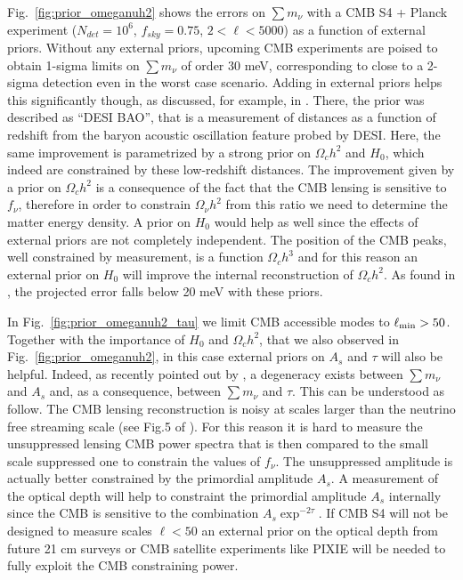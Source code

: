 \documentclass[aps,prd,reprint,superscriptaddress]{revtex4-1}
\newcommand{\reffig}[1]{Fig.~\ref{fig:#1}}
\begin{document}
\reffig{prior_omeganuh2} shows the errors on $\sum m_\nu$ with a CMB S4 + Planck experiment ($N_{det}=10^{6}$, $f_{sky}=0.75$,  $2<\ell<5000$) as a function of external priors.
Without any external priors, upcoming CMB experiments are poised to obtain 1-sigma limits on $\sum m_\nu$ of order 30 meV, corresponding to close to a 2-sigma detection even in the worst case scenario. Adding in external priors helps this significantly though, as discussed, for example, in \cite{2013arXiv1309.5383A,pan:2015,allison:2015}. 
There, the prior was described as ``DESI BAO'', that is a measurement of distances as a function of redshift from the baryon acoustic oscillation feature probed by DESI. Here, the same improvement is parametrized by a strong prior on $\Omega_ch^2$ and $H_{0}$, which indeed are constrained by these low-redshift distances.
The improvement given by a prior on $\Omega_ch^2$ is a consequence of the fact that the CMB lensing is sensitive to $f_\nu$, therefore in order to constrain $\Omega_{\nu}h^2$ from this ratio we need to determine the matter energy density. 
A prior on  $H_{0}$ would help as well since the effects of external priors are not completely independent.
The position of the CMB peaks, well constrained by measurement, is a function $\Omega_ch^3$ and for this reason an external prior on $H_{0}$ will improve the internal reconstruction of $\Omega_ch^2$.
As found in \cite{2013arXiv1309.5383A,pan:2015,allison:2015}, the projected error falls below 20 meV with these priors.

In \reffig{prior_omeganuh2_tau} we limit CMB accessible modes to $\ell_{\rm min}>50$. 
Together with the importance of $H_{0}$ and $\Omega_ch^2$, that we also observed in \reffig{prior_omeganuh2}, in this case external priors on $A_{s}$ and $\tau$ will also be helpful.
Indeed, as recently pointed out by \cite{allison:2015}, a degeneracy exists between $\sum m_\nu$ and $A_{s}$ and, as a consequence, between $\sum m_\nu$ and $\tau$. This can be understood as follow.
The CMB lensing reconstruction is noisy at scales larger than the neutrino free streaming scale (see Fig.5 of \cite{2013arXiv1309.5383A}). For this reason it is hard to measure the unsuppressed lensing CMB power spectra that is then compared to the small scale suppressed one to constrain the values of $f_{\nu}$. The unsuppressed amplitude is actually better constrained by the primordial amplitude $A_{s}$.
A measurement of the optical depth will help to constraint the primordial amplitude $A_{s}$ internally since the CMB is sensitive to the combination $A_{s}\exp^{-2\tau}$. If CMB S4 will not be designed to measure scales $\ell<50$ an external prior on the optical depth from future 21 cm surveys \cite{liu:2015} or CMB satellite experiments like PIXIE \cite{kogut:2011} will be needed to fully exploit the CMB constraining power.
\end{document}
